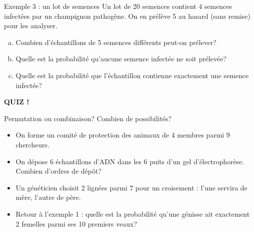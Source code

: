 \documentclass{BeamerTemplate}
\begin{document}
\begin{frame}[t]{Exemple 3 : un lot de semences}
  Un lot de 20 semences contient 4 semences infectées par un champignon
  pathogène. On en prélève 5 au hasard (sans remise) pour les analyser.

  \begin{enumerate}[a)]\itemsep 5mm
    \item Combien d'échantillons de 5 semences différents peut-on prélever?

    \item Quelle est la probabilité qu'aucune semence infectée ne soit
      prélevée?

    \item Quelle est la probabilité que l'échantillon contienne exactement une
      semence infectée?

  \end{enumerate}

  \medskip
\end{frame}

\begin{frame}[plain,t]
  \centerline{\LARGE\bfseries\alert{QUIZ !}}

  \medskip
  Permutation ou combinaison? Combien de possibilités?
  \begin{itemize}\itemsep 1.0cm
    \item On forme un comité de protection des animaux de 4 membres parmi 9
      chercheurs.
    \item On dépose 6 échantillons d'ADN dans les 6 puits d'un gel
      d'électrophorèse. Combien d'ordres de dépôt?
    \item Un généticien choisit 2 lignées parmi 7 pour un croisement : l'une
      servira de mère, l'autre de père.
    \item<2-> Retour à l'exemple 1 : quelle est la probabilité qu'une génisse
      ait exactement 2 femelles parmi ses 10 premiers veaux?
  \end{itemize}
\end{frame}
\end{document}
